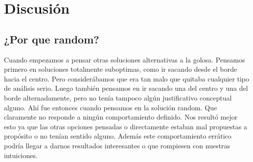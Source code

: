 \section{Discusi\'on}


\subsection{¿Por que random?}

Cuando empezamos a pensar otras soluciones alternativas a la golosa. Pensamos primero en soluciones totalmente suboptimas, como ir sacando desde el borde hacia el centro. Pero considerábamos que era tan malo que quitaba cualquier tipo de análisis serio. Luego también pensamos en ir sacando una del centro y una del borde alternadamente, pero no tenía tampoco algún justificativo conceptual alguno. Ahí fue entonces cuando pensamos en la solución random. Que claramente no responde a ningún comportamiento definido. Nos resultó mejor esto ya que las otras opciones pensadas o directamente estaban mal propuestas a propósito o no tenían sentido alguno. Además este comportamiento errático podría llegar a darnos resultados interesantes o que rompiesen con nuestras intuiciones.








